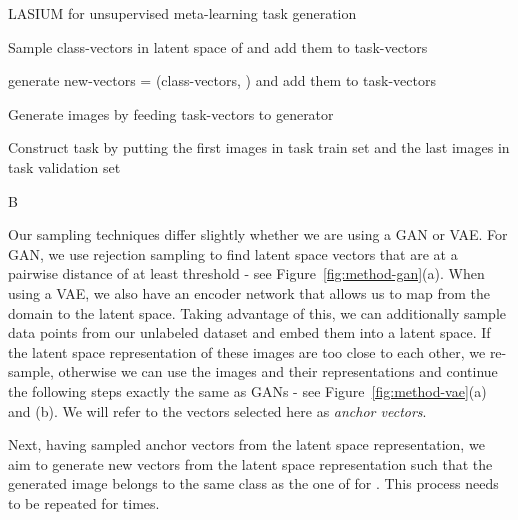 \documentclass{article}
\begin{document}
\begin{algorithm}[t]
\label{alg:LASIUM}
\caption{LASIUM for unsupervised meta-learning task generation}



 {


    
    Sample  class-vectors in latent space of  and add them to task-vectors
    
     {
        generate new-vectors = (class-vectors, )
        and 
        add them to task-vectors
        
    }
    
    Generate  images by feeding task-vectors to generator 
    
    Construct task  by putting the first  images in task train set and the last  images in task validation set
    
    
}


\Return B

\end{algorithm}

 Our sampling techniques differ slightly whether we are using a GAN or VAE. For GAN, we use rejection sampling to find  latent space vectors that are at a pairwise distance of at least threshold  - see Figure~\ref{fig:method-gan}(a). When using a VAE, we also have an encoder network that allows us to map from the domain to the latent space. Taking advantage of this, we can additionally sample data points from our unlabeled dataset  and embed them into a latent space. If the latent space representation of these  images are too close to each other, we re-sample, otherwise we can use the  images and their representations and continue the following steps exactly the same as GANs - see Figure~\ref{fig:method-vae}(a) and (b). We will refer to the vectors selected here as {\em anchor vectors}.

\label{generating_class_candidates}
Next, having  sampled anchor vectors  from the latent space representation, we aim to generate  new vectors  from the latent space representation such that the generated image  belongs to the same class as the one of  for . This process needs to be repeated  for  times.
\end{document}
